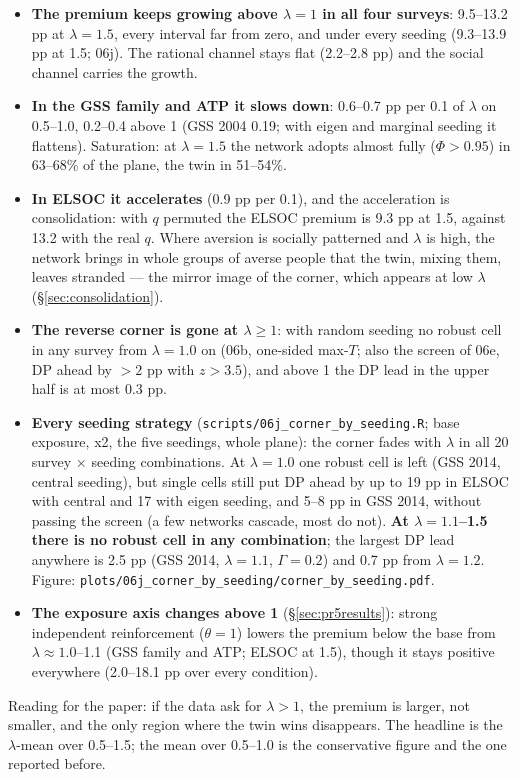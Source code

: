 \documentclass[11pt,a4paper]{article}
\newcommand{\code}[1]{\texttt{#1}}
\begin{document}
\begin{itemize}
  \item \textbf{The premium keeps growing above $\lambda = 1$ in all four surveys}: 9.5--13.2 pp at
    $\lambda = 1.5$, every interval far from zero, and under every seeding (9.3--13.9 pp at 1.5; 06j). The
    rational channel stays flat (2.2--2.8 pp) and the social channel carries the growth.
  \item \textbf{In the GSS family and ATP it slows down}: 0.6--0.7 pp per 0.1 of $\lambda$ on 0.5--1.0, 0.2--0.4
    above 1 (GSS 2004 0.19; with eigen and marginal seeding it flattens). Saturation: at $\lambda = 1.5$ the network
    adopts almost fully ($\Phi > 0.95$) in 63--68\% of the plane, the twin in 51--54\%.
  \item \textbf{In ELSOC it accelerates} (0.9 pp per 0.1), and the acceleration is consolidation: with $q$
    permuted the ELSOC premium is 9.3 pp at 1.5, against 13.2 with the real $q$. Where aversion is socially
    patterned and $\lambda$ is high, the network brings in whole groups of averse people that the twin, mixing
    them, leaves stranded --- the mirror image of the corner, which appears at low $\lambda$
    (\S\ref{sec:consolidation}).
  \item \textbf{The reverse corner is gone at $\lambda \ge 1$}: with random seeding no robust cell in any survey
    from $\lambda = 1.0$ on (06b, one-sided max-$T$; also the screen of 06e, DP ahead by $> 2$ pp with $z > 3.5$), and
    above 1 the DP lead in the upper half is at most 0.3 pp.
  \item \textbf{Every seeding strategy} (\code{scripts/06j\_corner\_by\_seeding.R}; base exposure, x2, the five
    seedings, whole plane): the corner fades with $\lambda$ in all 20 survey $\times$ seeding combinations. At
    $\lambda = 1.0$ one robust cell is left (GSS 2014, central seeding), but single cells still put DP ahead by
    up to 19 pp in ELSOC with central and 17 with eigen seeding, and 5--8 pp in GSS 2014, without passing the
    screen (a few networks cascade, most do not). \textbf{At $\lambda = 1.1$--1.5 there is no robust cell in any
    combination}; the largest DP lead anywhere is 2.5 pp (GSS 2014, $\lambda = 1.1$, $\Gamma = 0.2$) and 0.7 pp from
    $\lambda = 1.2$. Figure: \code{plots/06j\_corner\_by\_seeding/corner\_by\_seeding.pdf}.
  \item \textbf{The exposure axis changes above 1} (\S\ref{sec:pr5results}): strong independent reinforcement
    ($\theta = 1$) lowers the premium below the base from $\lambda \approx 1.0$--1.1 (GSS family and ATP; ELSOC at 1.5),
    though it stays positive everywhere (2.0--18.1 pp over every condition).
\end{itemize}
Reading for the paper: if the data ask for $\lambda > 1$, the premium is larger, not smaller, and the only region
where the twin wins disappears. The headline is the $\lambda$-mean over 0.5--1.5; the mean over 0.5--1.0 is the
conservative figure and the one reported before.
\end{document}

